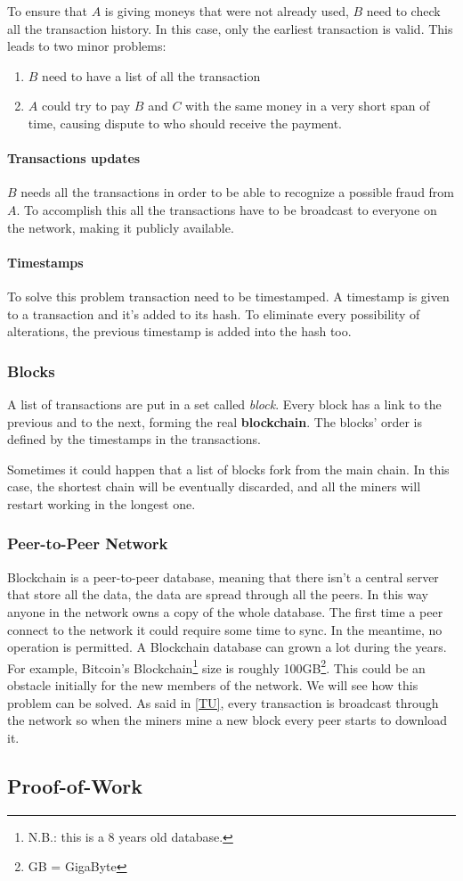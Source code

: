 To ensure that $A$ is giving moneys that were not already used, $B$ need to
check all the transaction history. In this case, only the earliest transaction
is valid\cite{nakamoto08}. This leads to two minor problems:
\begin{enumerate}
 \item $B$ need to have a list of all the transaction
 \item $A$ could try to pay $B$ and $C$ with the same money in a very short
span of time, causing dispute to who should receive the payment.
\end{enumerate}

\paragraph*{Transactions updates}
\label{TU}
$B$ needs all the transactions in order to be able to recognize a possible
fraud from $A$. To accomplish this all the transactions have to be broadcast to
everyone on the network, making it publicly available.

\paragraph*{Timestamps}
To solve this problem transaction need to be timestamped. A timestamp is given
to a transaction and it's added to its hash. To eliminate every possibility of
alterations, the previous timestamp is added into the hash too.

\subsubsection{Blocks}
A list of transactions are put in a set called \textit{block}. Every block has
a link to the previous and to the next, forming the real \textbf{blockchain}.
The blocks' order is defined by the timestamps in the transactions.

Sometimes it could happen that a list of blocks fork from the main chain. In
this case, the shortest chain will be eventually discarded, and all the miners
will restart working in the longest one\cite{sok15}.

\subsubsection{Peer-to-Peer Network}

Blockchain is a peer-to-peer database, meaning that there isn't a central
server that store all the data, the data are spread through all the peers.
In this way anyone in the network owns a copy of the whole database. The first
time a peer connect to the network it could require some time to sync. In the
meantime, no operation is permitted. A Blockchain database can grown a lot
during the years. For example, Bitcoin's Blockchain\footnote{N.B.: this is a 8
years old database.} size is roughly 100GB\footnote{GB = GigaByte}. This could
be an obstacle initially for the new members of the network. We will see how
this problem can be solved.
As said in \ref{TU}, every transaction is broadcast through the network so when
the miners mine a new block every peer starts to download it.

\subsection{Proof-of-Work}

